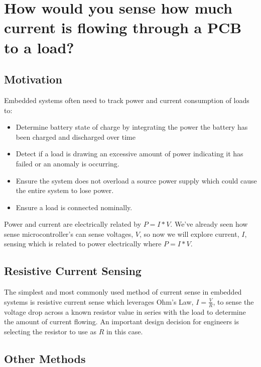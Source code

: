 \documentclass[main.tex]{subfiles}
\begin{document}
\section{How would you sense how much current is flowing through a PCB to a load?}

\subsection{Motivation}
Embedded systems often need to track power and current consumption of loads to:
\begin{itemize}
    \item Determine battery state of charge by integrating the power the battery has been charged and discharged over time
    \item Detect if a load is drawing an excessive amount of power indicating it has failed or an anomaly is occurring. 
    \item Ensure the system does not overload a source power supply which could cause the entire system to lose power. 
    \item Ensure a load is connected nominally.
\end{itemize}
Power and current are electrically related by $P = I * V$. We've already seen how sense microcontroller's can sense voltages, $V$, so now we will explore current, $I$, sensing which is related to power electrically where $P = I * V$.

\subsection{Resistive Current Sensing}
The simplest and most commonly used method of current sense in embedded systems is resistive current sense which leverages Ohm's Law, $I = \frac{V}{R}$, to sense the voltage drop across a known resistor value in series with the load to determine the amount of current flowing.
An important design decision for engineers is selecting the resistor to use as $R$ in this case. 





\subsection{Other Methods}
\end{document}
